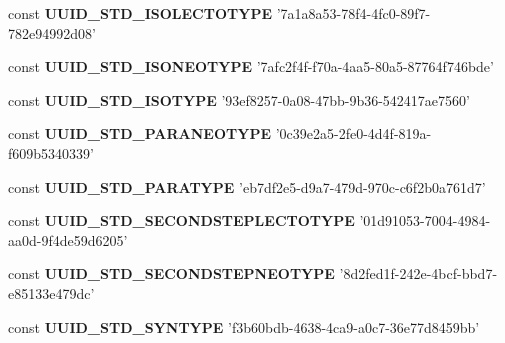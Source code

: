 \begin{DoxyCompactItemize}
\item 
\hypertarget{uuids_8php_acc0abcdec3109d3515ecd646b001b8c5}{const {\bfseries U\-U\-I\-D\-\_\-\-S\-T\-D\-\_\-\-I\-S\-O\-L\-E\-C\-T\-O\-T\-Y\-P\-E} '7a1a8a53-\/78f4-\/4fc0-\/89f7-\/782e94992d08'}\label{uuids_8php_acc0abcdec3109d3515ecd646b001b8c5}

\item 
\hypertarget{uuids_8php_ab0883dce4391e6148f78f720dcad93ef}{const {\bfseries U\-U\-I\-D\-\_\-\-S\-T\-D\-\_\-\-I\-S\-O\-N\-E\-O\-T\-Y\-P\-E} '7afc2f4f-\/f70a-\/4aa5-\/80a5-\/87764f746bde'}\label{uuids_8php_ab0883dce4391e6148f78f720dcad93ef}

\item 
\hypertarget{uuids_8php_a7c09f30cb21e3a7c651f27eb65d05cc4}{const {\bfseries U\-U\-I\-D\-\_\-\-S\-T\-D\-\_\-\-I\-S\-O\-T\-Y\-P\-E} '93ef8257-\/0a08-\/47bb-\/9b36-\/542417ae7560'}\label{uuids_8php_a7c09f30cb21e3a7c651f27eb65d05cc4}

\item 
\hypertarget{uuids_8php_aed9eb3dc20b4ef12893c4491e74bc0b7}{const {\bfseries U\-U\-I\-D\-\_\-\-S\-T\-D\-\_\-\-P\-A\-R\-A\-N\-E\-O\-T\-Y\-P\-E} '0c39e2a5-\/2fe0-\/4d4f-\/819a-\/f609b5340339'}\label{uuids_8php_aed9eb3dc20b4ef12893c4491e74bc0b7}

\item 
\hypertarget{uuids_8php_a52e567b75faf9d2080cf18f51c3a95e5}{const {\bfseries U\-U\-I\-D\-\_\-\-S\-T\-D\-\_\-\-P\-A\-R\-A\-T\-Y\-P\-E} 'eb7df2e5-\/d9a7-\/479d-\/970c-\/c6f2b0a761d7'}\label{uuids_8php_a52e567b75faf9d2080cf18f51c3a95e5}

\item 
\hypertarget{uuids_8php_a2345f843c973e16bd72b92a3717dbbe0}{const {\bfseries U\-U\-I\-D\-\_\-\-S\-T\-D\-\_\-\-S\-E\-C\-O\-N\-D\-S\-T\-E\-P\-L\-E\-C\-T\-O\-T\-Y\-P\-E} '01d91053-\/7004-\/4984-\/aa0d-\/9f4de59d6205'}\label{uuids_8php_a2345f843c973e16bd72b92a3717dbbe0}

\item 
\hypertarget{uuids_8php_acabb12b31780befa1c194d2e0bfff5ed}{const {\bfseries U\-U\-I\-D\-\_\-\-S\-T\-D\-\_\-\-S\-E\-C\-O\-N\-D\-S\-T\-E\-P\-N\-E\-O\-T\-Y\-P\-E} '8d2fed1f-\/242e-\/4bcf-\/bbd7-\/e85133e479dc'}\label{uuids_8php_acabb12b31780befa1c194d2e0bfff5ed}

\item 
\hypertarget{uuids_8php_ab2986bf46826861dedf9761a499da8a1}{const {\bfseries U\-U\-I\-D\-\_\-\-S\-T\-D\-\_\-\-S\-Y\-N\-T\-Y\-P\-E} 'f3b60bdb-\/4638-\/4ca9-\/a0c7-\/36e77d8459bb'}\label{uuids_8php_ab2986bf46826861dedf9761a499da8a1}


\end{DoxyCompactItemize}
